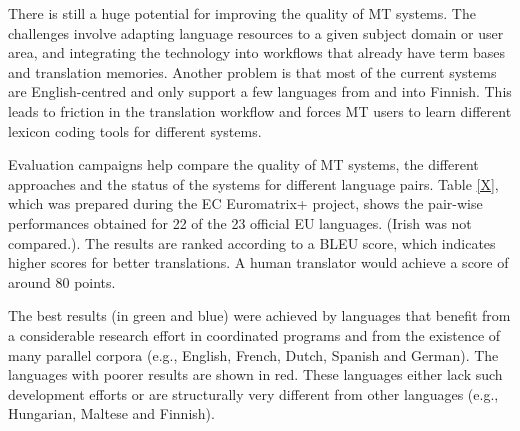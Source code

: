\documentclass{../../metanetpaper}
\begin{document}
\begin{Parallel}[c]{79mm}{78mm}
{There is still a huge potential for improving the quality of MT
systems. The challenges involve adapting language resources to a given
subject domain or user area, and integrating the technology into
workflows that already have term bases and translation
memories. Another problem is that most of the current systems are
English-centred and only support a few languages from and into
Finnish. This leads to friction in the translation workflow and forces
MT users to learn different lexicon coding tools for different
systems.

Evaluation campaigns help compare the quality of MT systems, the
different approaches and the status of the systems for different
language pairs. Table \ref{X}, which was prepared during the EC
Euromatrix+ project, shows the pair-wise performances obtained for 22
of the 23 official EU languages. (Irish was not compared.). The
results are ranked according to a BLEU score, which indicates higher
scores for better translations\cite{BLEU}. A human translator would
achieve a score of around 80 points.

The best results (in green and blue) were achieved by languages that
benefit from a considerable research effort in coordinated programs
and from the existence of many parallel corpora (e.g., English,
French, Dutch, Spanish and German). The languages with poorer results
are shown in red. These languages either lack such development efforts
or are structurally very different from other languages (e.g.,
Hungarian, Maltese and Finnish).



}

\ParallelPar





\end{Parallel}
\end{document}
